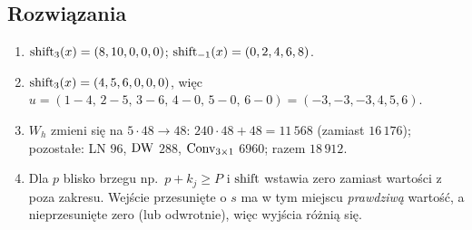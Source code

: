 \subsection*{Rozwiązania}
\begin{enumerate}
\item $\operatorname{shift}_3(x)=(8,10,0,0,0)$; $\operatorname{shift}_{-1}(x)=(0,2,4,6,8)$.
\item $\operatorname{shift}_3(x)=(4,5,6,0,0,0)$, więc $u=(1-4,\,2-5,\,3-6,\,4-0,\,5-0,\,6-0)=(-3,-3,-3,4,5,6)$.
\item $W_h$ zmieni się na $5\cdot48\to48$: $240\cdot48+48=11\,568$ (zamiast $16\,176$); pozostałe: LN $96$, $\operatorname{DW}$ $288$, $\operatorname{Conv}_{3\times1}$ $6960$; razem $18\,912$.
\item Dla $p$ blisko brzegu np.\ $p+k_j\ge P$ i $\operatorname{shift}$ wstawia zero zamiast wartości z poza zakresu. Wejście przesunięte o $s$ ma w tym miejscu \emph{prawdziwą} wartość, a nieprzesunięte zero (lub odwrotnie), więc wyjścia różnią się.
\end{enumerate}
